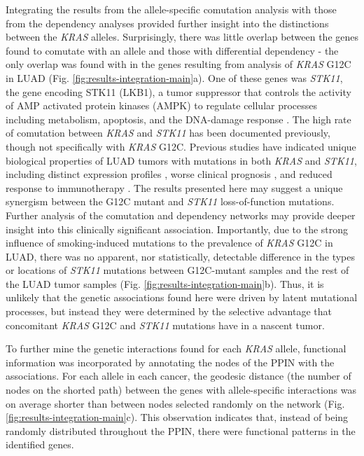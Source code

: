 \documentclass[english, 10pt, letterpaper]{article}
\newcommand{\KRAS}{\emph{KRAS}}
\begin{document}
Integrating the results from the allele-specific comutation analysis with those from the dependency analyses provided further insight into the distinctions between the \KRAS{} alleles.
Surprisingly, there was little overlap between the genes found to comutate with an allele and those with differential dependency - the only overlap was found with in the genes resulting from analysis of \KRAS{} G12C in LUAD (Fig. \ref{fig:results-integration-main}a).
One of these genes was \emph{STK11}, the gene encoding STK11 (LKB1), a tumor suppressor that controls the activity of AMP activated protein kinases (AMPK) to regulate cellular processes including metabolism, apoptosis, and the DNA-damage response \cite{Momcilovic2015TargetingVulnerabilities., Korsse2013TargetingCancer.}.
The high rate of comutation between \KRAS{} and \emph{STK11} has been documented previously, though not specifically with \KRAS{} G12C.
Previous studies have indicated unique biological properties of LUAD tumors with mutations in both \KRAS{} and \emph{STK11}, including distinct expression profiles \cite{Skoulidis2015Co-occurringVulnerabilities.}, worse clinical prognosis \cite{LaFleur2019MutationSTK11, Bange2019ImpactCancer.}, and reduced response to immunotherapy \cite{Skoulidis2018STK11/LKB1Adenocarcinoma.}.
The results presented here may suggest a unique synergism between the G12C mutant and \emph{STK11} loss-of-function mutations.
Further analysis of the comutation and dependency networks may provide deeper insight into this clinically significant association.
Importantly, due to the strong influence of smoking-induced mutations to the prevalence of \KRAS{} G12C in LUAD, there was no apparent, nor statistically, detectable difference in the types or locations of \emph{STK11} mutations between G12C-mutant samples and the rest of the LUAD tumor samples (Fig. \ref{fig:results-integration-main}b).
Thus, it is unlikely that the genetic associations found here were driven by latent mutational processes, but instead they were determined by the selective advantage that concomitant \KRAS{} G12C and \emph{STK11} mutations have in a nascent tumor.

To further mine the genetic interactions found for each \KRAS{} allele, functional information was incorporated by annotating the nodes of the PPIN with the associations.
For each allele in each cancer, the geodesic distance (the number of nodes on the shorted path) between the genes with allele-specific interactions was on average shorter than between nodes selected randomly on the network (Fig. \ref{fig:results-integration-main}c).
This observation indicates that, instead of being randomly distributed throughout the PPIN, there were functional patterns in the identified genes.
\end{document}
